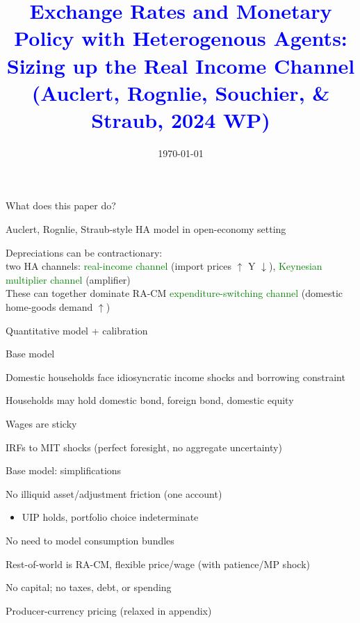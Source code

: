 \documentclass[notes,11pt, aspectratio=169]{beamer}
\title[]{\textcolor{blue}{Exchange Rates and Monetary Policy with Heterogenous Agents:\\Sizing up the Real Income Channel\\(Auclert, Rognlie, Souchier, \& Straub, 2024 WP)}}
\date{\today}
\newenvironment{wideitemize}{\itemize\addtolength{\itemsep}{10pt}}{\enditemize}
\begin{document}
\begin{frame}
  \titlepage
\end{frame}

\begin{frame}{What does this paper do?}
\begin{wideitemize}
\item Auclert, Rognlie, Straub-style HA model in open-economy setting
\item Depreciations can be contractionary:\\two HA channels: \textcolor{green}{real-income channel} (import prices $\uparrow$ Y $\downarrow$),  \textcolor{green}{Keynesian multiplier channel} (amplifier)\\These can together dominate RA-CM \textcolor{green}{expenditure-switching channel} (domestic home-goods demand $\uparrow$)
\item Quantitative model + calibration
\end{wideitemize}
\end{frame}


\begin{frame}{Base model}
\begin{wideitemize}
\item Domestic households face idiosyncratic income shocks and borrowing constraint
\item Households may hold domestic bond, foreign bond, domestic equity
\item Wages are sticky
\item IRFs to MIT shocks (perfect foresight, no aggregate uncertainty)
\end{wideitemize}
\end{frame}


\begin{frame}{Base model: simplifications}
\begin{wideitemize}
\item No illiquid asset/adjustment friction (one account)
\begin{itemize}
  \item UIP holds, portfolio choice indeterminate
\end{itemize}
\item No need to model consumption bundles
\item Rest-of-world is RA-CM, flexible price/wage (with patience/MP shock)
\item<2-> No capital; no taxes, debt, or spending
\item<2-> Producer-currency pricing (relaxed in appendix)
\end{wideitemize}
\end{frame}
\end{document}
